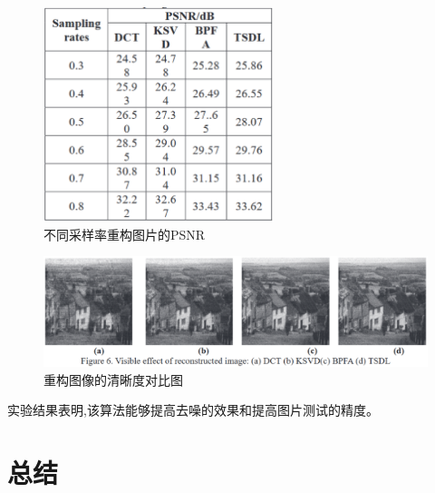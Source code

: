 \documentclass[12pt,a4paper,UTF8]{ctexart}
\begin{document}
\begin{figure}[htpb]
     \centering
     \includegraphics[width=0.6\textwidth]{allpicture/不同采样率重构图片的PSNR.eps}
     \caption{不同采样率重构图片的PSNR}
     \label{fig:不同采样率重构图片的PSNR}
\end{figure}
\begin{figure}[htpb]
     \centering
     \includegraphics[width=1\textwidth]{allpicture/重构图像的清晰度对比图.eps}
     \caption{重构图像的清晰度对比图}
     \label{fig:重构图像的清晰度对比图}
\end{figure}
实验结果表明,该算法能够提高去噪的效果和提高图片测试的精度。
\section{总结}













\end{document}
